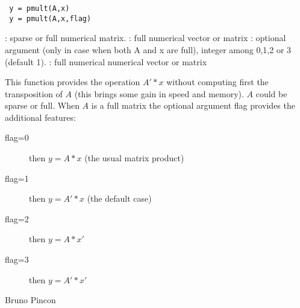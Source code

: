 
\begin{mandesc}
\end{mandesc}

\begin{calling_sequence}
\begin{verbatim}
 y = pmult(A,x) 
 y = pmult(A,x,flag)
\end{verbatim}
\end{calling_sequence}
\begin{parameters}
  \begin{varlist}
    :  sparse or full numerical matrix.
    : full numerical vector or matrix
    : optional argument (only in case when both A and x are full), integer among 0,1,2 or 3 (default 1).
    : full numerical numerical vector or matrix
  \end{varlist}
\end{parameters}

\begin{mandescription}
This function provides the operation $A'*x$ without computing first the transposition of $A$
(this brings some gain in speed and memory). $A$ could be sparse or full. When $A$ is a full
matrix the optional argument flag provides the additional features:
\begin{description}
\item[flag=0] then $y = A*x$ (the usual matrix product)
\item[flag=1] then $y = A'*x$ (the default case)
\item[flag=2] then $y = A*x'$
\item[flag=3] then $y = A'*x'$
\end{description} 
\end{mandescription}

\begin{examples}
  \begin{program}  
\end{program}
\end{examples}


\begin{authors}
   Bruno Pincon
\end{authors}
